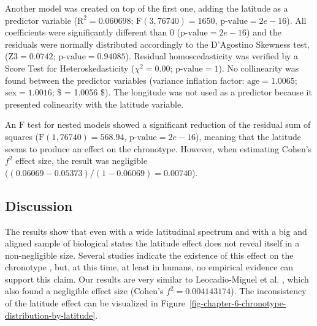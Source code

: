 \documentclass[
12pt,
openright,
oneside,
a4paper,
chapter=TITLE,
section=TITLE,
french,
spanish,
brazil,
english
]{abntex2}\usepackage{array}
\begin{document}
Another model was created on top of the first one, adding the latitude
as a predictor variable (\(\text{R}^{2} = 0.060698\);
\(\text{F}(3, 76740) = 1650\), \(\text{p-value} = 2e-16\)). All
coefficients were significantly different than 0
(\(\text{p-value} = 2e-16\)) and the residuals were normally distributed
accordingly to the D'Agostino Skewness test, (\(\text{Z3} = 0.0742\);
\(\text{p-value} = 0.94085\)). Residual homoscedasticity was verified by
a Score Test for Heteroskedasticity (\(\chi^{2} = 0.00\);
\(\text{p-value} = 1\)). No collinearity was found between the predictor
variables (variance inflation factor: \(\text{age} = 1.0065\);
\(\text{sex} = 1.0016\); \$ = 1.0056 \$). The longitude
was not used as a predictor because it presented colinearity with the
latitude variable.

An \(\text{F}\) test for nested models showed a significant reduction of
the residual sum of squares (\(\text{F}(1, 76740) = 568.94\),
\(\text{p-value} = 2e-16\)), meaning that the latitude seems to produce
an effect on the chronotype. However, when estimating Cohen's \(f^2\)
effect size, the result was negligible \autocite{cohen1992}
\(((0.06069 - 0.05373) / (1 - 0.06069) = 0.00740\)).

\subsection{Discussion}\label{discussion}

The results show that even with a wide latitudinal spectrum and with a
big and aligned sample of biological states the latitude effect does not
reveal itself in a non-negligible size. Several studies indicate the
existence of this effect on the chronotype
\autocite{hut2013,leocadio-miguel2017,pittendrigh1991,randler2008,randler2017,roenneberg2003},
but, at this time, at least in humans, no empirical evidence can support
this claim. Our results are very similar to Leocadio-Miguel et al.
\autocite*{leocadio-miguel2017}, which also found a negligible effect
size (Cohen's \(f^{2} = 0.004143174\)). The inconsistency of the
latitude effect can be visualized in
Figure~\ref{fig-chapter-6-chronotype-distribution-by-latitude}.
\end{document}
